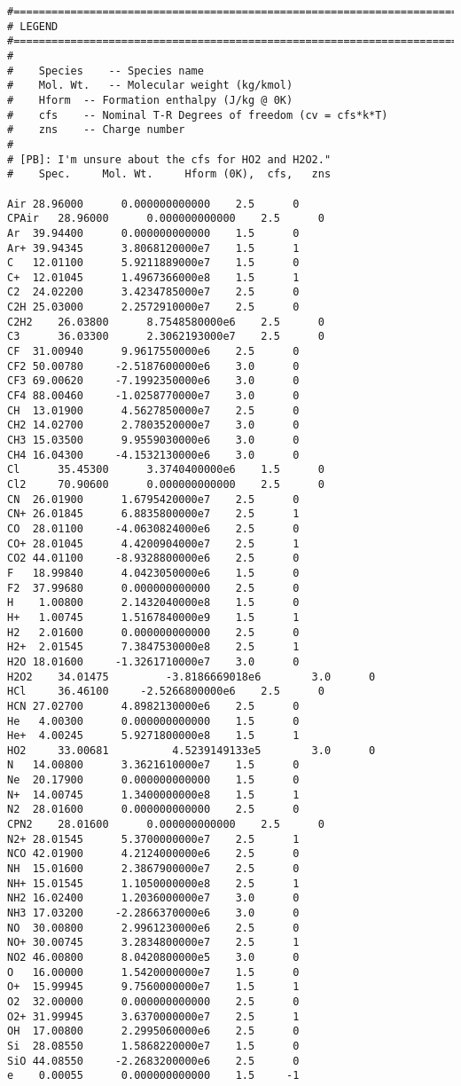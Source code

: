 \linenumbers*
\begin{verbatim}
#===========================================================================
# LEGEND
#===========================================================================
#
#    Species 	-- Species name
#    Mol. Wt.	-- Molecular weight (kg/kmol)
#    Hform	-- Formation enthalpy (J/kg @ 0K)
#    cfs	-- Nominal T-R Degrees of freedom (cv = cfs*k*T)
#    zns	-- Charge number
#
# [PB]: I'm unsure about the cfs for HO2 and H2O2."
#    Spec.     Mol. Wt.     Hform (0K),  cfs,   zns

Air	28.96000	  0.000000000000 	2.5 	 0
CPAir	28.96000	  0.000000000000 	2.5 	 0
Ar	39.94400	  0.000000000000 	1.5 	 0
Ar+	39.94345	  3.8068120000e7 	1.5 	 1
C	12.01100	  5.9211889000e7 	1.5 	 0
C+	12.01045	  1.4967366000e8 	1.5 	 1
C2	24.02200	  3.4234785000e7 	2.5 	 0
C2H	25.03000	  2.2572910000e7 	2.5 	 0
C2H2	26.03800	  8.7548580000e6 	2.5 	 0
C3      36.03300	  2.3062193000e7 	2.5 	 0
CF	31.00940	  9.9617550000e6 	2.5 	 0
CF2	50.00780	 -2.5187600000e6 	3.0 	 0
CF3	69.00620	 -7.1992350000e6 	3.0 	 0
CF4	88.00460	 -1.0258770000e7 	3.0 	 0
CH	13.01900	  4.5627850000e7 	2.5 	 0
CH2	14.02700	  2.7803520000e7 	3.0 	 0
CH3	15.03500	  9.9559030000e6 	3.0 	 0
CH4	16.04300	 -4.1532130000e6 	3.0 	 0
Cl      35.45300	  3.3740400000e6 	1.5 	 0
Cl2     70.90600	  0.000000000000 	2.5 	 0
CN	26.01900	  1.6795420000e7 	2.5 	 0
CN+	26.01845	  6.8835800000e7 	2.5 	 1
CO	28.01100	 -4.0630824000e6 	2.5 	 0
CO+	28.01045	  4.4200904000e7 	2.5 	 1
CO2	44.01100	 -8.9328800000e6 	2.5 	 0
F	18.99840	  4.0423050000e6 	1.5 	 0
F2	37.99680	  0.000000000000 	2.5 	 0
H	 1.00800	  2.1432040000e8 	1.5 	 0
H+	 1.00745	  1.5167840000e9 	1.5 	 1
H2	 2.01600	  0.000000000000 	2.5 	 0
H2+	 2.01545	  7.3847530000e8 	2.5 	 1
H2O	18.01600	 -1.3261710000e7 	3.0 	 0
H2O2    34.01475         -3.8186669018e6        3.0      0
HCl     36.46100	 -2.5266800000e6 	2.5 	 0
HCN	27.02700	  4.8982130000e6 	2.5 	 0
He	 4.00300	  0.000000000000 	1.5 	 0
He+	 4.00245	  5.9271800000e8 	1.5 	 1
HO2     33.00681          4.5239149133e5        3.0      0
N	14.00800	  3.3621610000e7 	1.5 	 0
Ne	20.17900	  0.000000000000 	1.5 	 0
N+	14.00745	  1.3400000000e8 	1.5 	 1
N2	28.01600	  0.000000000000 	2.5 	 0
CPN2	28.01600	  0.000000000000 	2.5 	 0
N2+	28.01545	  5.3700000000e7 	2.5 	 1
NCO	42.01900	  4.2124000000e6 	2.5 	 0
NH	15.01600	  2.3867900000e7 	2.5 	 0
NH+	15.01545	  1.1050000000e8 	2.5 	 1
NH2	16.02400	  1.2036000000e7 	3.0 	 0
NH3	17.03200	 -2.2866370000e6 	3.0 	 0
NO	30.00800	  2.9961230000e6 	2.5 	 0
NO+	30.00745	  3.2834800000e7 	2.5 	 1
NO2	46.00800	  8.0420800000e5 	3.0 	 0
O	16.00000	  1.5420000000e7 	1.5 	 0
O+	15.99945	  9.7560000000e7 	1.5 	 1
O2	32.00000	  0.000000000000 	2.5 	 0
O2+	31.99945	  3.6370000000e7 	2.5 	 1
OH	17.00800	  2.2995060000e6 	2.5 	 0
Si	28.08550	  1.5868220000e7 	1.5 	 0
SiO	44.08550	 -2.2683200000e6 	2.5 	 0
e	 0.00055	  0.000000000000 	1.5 	-1
\end{verbatim}
\nolinenumbers

